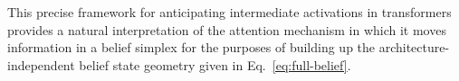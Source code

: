\documentclass{article}
\theoremstyle{plain}
\theoremstyle{definition}
\theoremstyle{remark}
\begin{document}


This precise framework for anticipating 
intermediate activations in transformers provides a natural interpretation of the attention mechanism in which it moves information in a belief simplex for the purposes of building up the architecture-independent belief state geometry given in Eq.~\eqref{eq:full-belief}.





\end{document}
